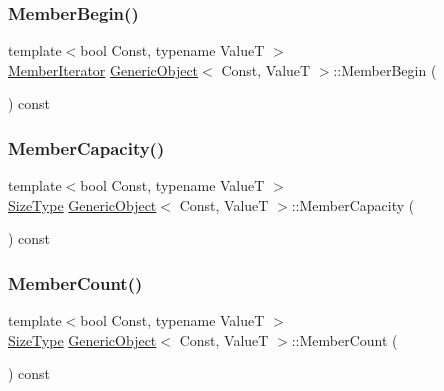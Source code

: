 \mbox{\label{classGenericObject_af1e80a8a521f05530f9b6a448242ff2d}} 
\subsubsection{\texorpdfstring{Member\+Begin()}{MemberBegin()}}
{\footnotesize\ttfamily template$<$bool Const, typename ValueT $>$ \\
\hyperlink{classGenericObject_a1f531d70f8d57ed30199ac445b5935e6}{Member\+Iterator} \hyperlink{classGenericObject}{Generic\+Object}$<$ Const, ValueT $>$\+::Member\+Begin (\begin{DoxyParamCaption}{ }\end{DoxyParamCaption}) const\hspace{0.3cm}{\ttfamily [inline]}}

\mbox{\label{classGenericObject_a0389754cbdb435d732bad6edf4f8cdb2}} 
\subsubsection{\texorpdfstring{Member\+Capacity()}{MemberCapacity()}}
{\footnotesize\ttfamily template$<$bool Const, typename ValueT $>$ \\
\hyperlink{rapidjson_8h_a5ed6e6e67250fadbd041127e6386dcb5}{Size\+Type} \hyperlink{classGenericObject}{Generic\+Object}$<$ Const, ValueT $>$\+::Member\+Capacity (\begin{DoxyParamCaption}{ }\end{DoxyParamCaption}) const\hspace{0.3cm}{\ttfamily [inline]}}

\mbox{\label{classGenericObject_a15326564c82f2b545811f753534563e4}} 
\subsubsection{\texorpdfstring{Member\+Count()}{MemberCount()}}
{\footnotesize\ttfamily template$<$bool Const, typename ValueT $>$ \\
\hyperlink{rapidjson_8h_a5ed6e6e67250fadbd041127e6386dcb5}{Size\+Type} \hyperlink{classGenericObject}{Generic\+Object}$<$ Const, ValueT $>$\+::Member\+Count (\begin{DoxyParamCaption}{ }\end{DoxyParamCaption}) const\hspace{0.3cm}{\ttfamily [inline]}}

